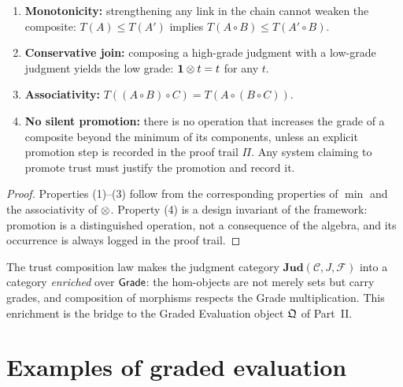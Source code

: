 \begin{proposition}
\label{prop:trust-properties}
\begin{enumerate}
\item \textbf{Monotonicity:} strengthening any link in the chain
  cannot weaken the composite:
  $T(A) \leq T(A')$ implies $T(A \circ B) \leq T(A' \circ B)$.

\item \textbf{Conservative join:} composing a high-grade judgment
  with a low-grade judgment yields the low grade:
  $\mathbf{1} \otimes t = t$ for any $t$.

\item \textbf{Associativity:} $T((A \circ B) \circ C) = T(A \circ (B \circ C))$.

\item \textbf{No silent promotion:} there is no operation that
  increases the grade of a composite beyond the minimum of its
  components, unless an explicit promotion step is recorded in the
  proof trail $\Pi$.  Any system claiming to promote trust must
  justify the promotion and record it.
\end{enumerate}
\end{proposition}

\begin{proof}
Properties (1)--(3) follow from the corresponding properties of $\min$
and the associativity of $\otimes$.  Property (4) is a design invariant
of the framework: promotion is a distinguished operation, not a
consequence of the algebra, and its occurrence is always logged in the
proof trail.
\end{proof}

\begin{remark}
\label{rem:trust-enrichment}
The trust composition law makes the judgment category
$\mathbf{Jud}(\mathcal{C}, J, \mathcal{F})$ into a category
\emph{enriched} over $\mathsf{Grade}$: the hom-objects are not merely sets but
carry grades, and composition of morphisms respects the Grade
multiplication.  This enrichment is the bridge to the Graded
Evaluation object $\mathfrak{Q}$ of Part~II.
\end{remark}



\section{Examples of graded evaluation}
\label{sec:grade:examples}

